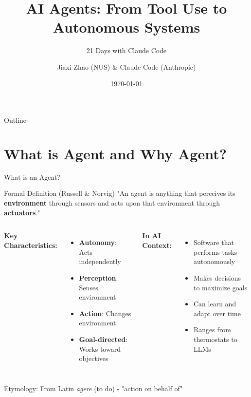 \documentclass[aspectratio=169]{beamer}
\title[AI Agents]{AI Agents: From Tool Use to Autonomous Systems}
\subtitle{21 Days with Claude Code}
\author[J. Zhao \& CC]{Jiaxi Zhao (NUS) \& Claude Code (Anthropic)}
\date[\today]{\today}
\begin{document}
\begin{frame}
\titlepage
\end{frame}

\begin{frame}{Outline}
\tableofcontents
\end{frame}

\section{What is Agent and Why Agent?}

\begin{frame}{What is an Agent?}
	\begin{block}{Formal Definition (Russell \& Norvig)}
		"An agent is anything that perceives its \textbf{environment} through sensors and acts upon that environment through \textbf{actuators}."
	\end{block}
	
	\vspace{0.3cm}
	
	\begin{columns}
		\textbf{Key Characteristics:}
		\begin{itemize}
			\item {\color{highlight}\textbf{Autonomy}}: Acts independently
			\item {\color{highlight}\textbf{Perception}}: Senses environment
			\item {\color{highlight}\textbf{Action}}: Changes environment
			\item {\color{highlight}\textbf{Goal-directed}}: Works toward objectives
		\end{itemize}
		
		\textbf{In AI Context:}
		\begin{itemize}
			\item Software that performs tasks autonomously
			\item Makes decisions to maximize goals
			\item Can learn and adapt over time
			\item Ranges from thermostats to LLMs
		\end{itemize}
	\end{columns}
	
	\vspace{0.3cm}
	
	\begin{center}
		\small
		{\color{gray}Etymology: From Latin \textit{agere} (to do) - "action on behalf of"}
	\end{center}
\end{frame}
\end{document}
